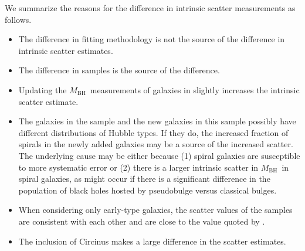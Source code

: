 \documentclass[twosided,letterpaper,numberedappendix]{emulateapj}
\newcommand{\mbh}      {\ensuremath{M_{\mathrm{BH}}}}
\begin{document}
We summarize the reasons for the difference in intrinsic scatter
measurements as follows.
\begin{itemize}
\item{The difference in fitting methodology is not the source of the
difference in intrinsic scatter estimates.}
%
\item{The difference in samples is the source of the difference.}
%
\item{Updating the \mbh\ measurements of galaxies in
\citet{tremaineetal02} slightly increases the intrinsic scatter
estimate.}
%
\item{The galaxies in the \citet{tremaineetal02} sample and the new
galaxies in this sample possibly have different distributions of
Hubble types.  If they do, the increased fraction of spirals in the
newly added galaxies may be a source of the increased scatter. The
underlying cause may be either because (1) spiral galaxies are
susceptible to more systematic error or (2) there is a larger
intrinsic scatter in \mbh\ in spiral galaxies, as might occur if there
is a significant difference in the population of black holes hosted by
pseudobulge versus classical bulges.}
%
\item{When considering only early-type galaxies, the scatter values of
the samples are consistent with each other and are close to the value
quoted by \citet{tremaineetal02}.}
%
\item{The inclusion of Circinus makes a large difference in the
scatter estimates.}
\end{itemize}
\end{document}
